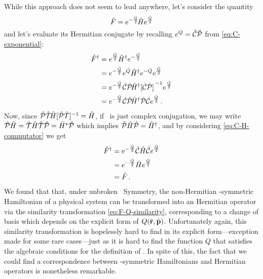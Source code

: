             While this approach does not seem to lead anywhere, let's consider the quantity
            \begin{equation}
                \label{eq:F-Q-similarity}
                \hat{F} = e^{-\frac{\hat{Q}}{2}}\!\hat{H}e^{\frac{\hat{Q}}{2}}
            \end{equation}
            and let's evaluate its Hermitian conjugate by recalling $e^{Q} = \mathcal{\hat{C}}\mathcal{\hat{P}}$ from \eqref{eq:C-exponential}:
            \begin{align*}
                \hF^\dag
                &= \myexp{\frac{\hQ}{2}} \hH^\dag \myexp{-\frac{\hQ}{2}} \\
                &= \myexp{-\frac{\hQ}{2}} \myexp{\hQ} \hH^\dag \myexp{-\hQ} \myexp{\frac{\hQ}{2}} \\
                &= \myexp{-\frac{\hQ}{2}} \hC\hP\! \hH^\dag \bqty*{\hC\hP}^{-1} \myexp{\frac{\hQ}{2}} \\
                &= \myexp{-\frac{\hQ}{2}} \hC\hP\! \hH^\dag \hP\hC \myexp{\frac{\hQ}{2}}
                \myperiod
            \end{align*}
            Now, since $\PTtransform{\hH} = \hH$, if \hT\ is just complex conjugation, we may write $\mathcal{\hat{P}}\hat{H} = \mathcal{\hat{T}}\hat{H}\mathcal{\hat{T}}\mathcal{\hat{P}} = \hat{H}^*\mathcal{\hat{P}}$ which implies $\mathcal{\hat{P}}\hat{H}\mathcal{\hat{P}} = \hat{H}^\dag$, and by considering \eqref{eq:C-H-commutator} we get \cite{bender2024}
            \begin{align*}
                \hat{F}^\dag 
                &= e^{-\frac{\hat{Q}}{2}} \mathcal{\hat{C}} \hat{H} \mathcal{\hat{C}} e^{\frac{\hat{Q}}{2}} \\
                &= e^{-\frac{\hat{Q}}{2}} \hat{H} e^{\frac{\hat{Q}}{2}} \\
                &= \hat{F}
                \,\text{.}
            \end{align*}
            We found that that, under unbroken \PT\ Symmetry, the non-Hermitian \PT-symmetric Hamiltonian of a physical system can be transformed into an Hermitian operator via the similarity transformation \eqref{eq:F-Q-similarity}, corresponding to a change of basis which depends on the explicit form of $Q\pqty{\hvr,\hvp}$. Unfortunately again, this similarity transformation is hopelessly hard to find in its explicit form---exception made for some rare cases---just as it is hard to find the function $Q$ that satisfies the algebraic conditions for the definition of \hC \cite{bender2024}. In spite of this, the fact that we could find a correspondence between \PT-symmetric Hamiltonians and Hermitian operators is nonetheless remarkable.
            
